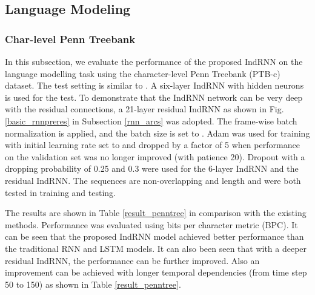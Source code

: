 \documentclass[10pt,twocolumn,letterpaper]{article}
\begin{document}
\subsection{Language Modeling}
\subsubsection{Char-level Penn Treebank}
In this subsection, we evaluate the performance of the proposed IndRNN on the language modelling task using the character-level Penn Treebank (PTB-c) dataset. The test setting is similar to \cite{cooijmans2016recurrent}. A six-layer IndRNN with  hidden neurons is used for the test. To demonstrate that the IndRNN network can be very deep with the residual connections, a 21-layer residual IndRNN as shown in Fig. \ref{basic_rnnpreres} in Subsection \ref{rnn_arcs} was adopted. The frame-wise batch normalization \cite{laurent2016batch} is applied, and the batch size is set to . Adam was used for training with initial learning rate set to  and dropped by a factor of 5 when performance on the validation set was no longer improved (with patience 20). Dropout \cite{gal2016theoretically} with a dropping probability of 0.25 and 0.3 were used for the 6-layer IndRNN and the residual IndRNN. The sequences are non-overlapping and length  and  were both tested in training and testing.

The results are shown in Table \ref{result_penntree} in comparison with the existing methods. Performance was evaluated using bits per character metric (BPC). It can be seen that the proposed IndRNN model achieved better performance than the traditional RNN and LSTM models. It can also been seen that with a deeper residual IndRNN, the performance can be further improved. Also an improvement can be achieved with longer temporal dependencies (from time step 50 to 150) as shown in Table \ref{result_penntree}. 
\end{document}
